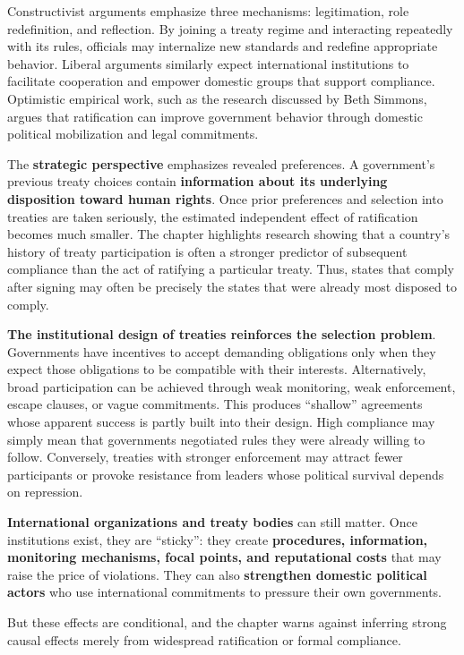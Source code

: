 Constructivist arguments emphasize three mechanisms: legitimation, role redefinition, and reflection. By joining a treaty regime and interacting repeatedly with its rules, officials may internalize new standards and redefine appropriate behavior. Liberal arguments similarly expect international institutions to facilitate cooperation and empower domestic groups that support compliance. Optimistic empirical work, such as the research discussed by Beth Simmons, argues that ratification can improve government behavior through domestic political mobilization and legal commitments.

The \textbf{strategic perspective} emphasizes revealed preferences. A government's previous treaty choices contain \textbf{information about its underlying disposition toward human rights}. Once prior preferences and selection into treaties are taken seriously, the estimated independent effect of ratification becomes much smaller. The chapter highlights research showing that a country's history of treaty participation is often a stronger predictor of subsequent compliance than the act of ratifying a particular treaty. Thus, states that comply after signing may often be precisely the states that were already most disposed to comply.

\textbf{The institutional design of treaties reinforces the selection problem}. Governments have incentives to accept demanding obligations only when they expect those obligations to be compatible with their interests. Alternatively, broad participation can be achieved through weak monitoring, weak enforcement, escape clauses, or vague commitments. This produces ``shallow'' agreements whose apparent success is partly built into their design. High compliance may simply mean that governments negotiated rules they were already willing to follow. Conversely, treaties with stronger enforcement may attract fewer participants or provoke resistance from leaders whose political survival depends on repression.

\textbf{International organizations and treaty bodies} can still matter. Once institutions exist, they are ``sticky'': they create \textbf{procedures, information, monitoring mechanisms, focal points, and reputational costs} that may raise the price of violations. They can also \textbf{strengthen domestic political actors} who use international commitments to pressure their own governments.

But these effects are conditional, and the chapter warns against inferring strong causal effects merely from widespread ratification or formal compliance.

